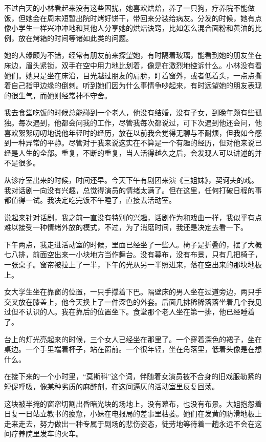 不过白天的小林看起来没有这些困扰，她喜欢烘焙，养了一只狗，疗养院不能做饭，但她会在周末短暂出院时烤好饼干，带回来分装给病友。分发的时候，她有点像小学生一样兴冲冲地和其他人分享她的烘焙诀窍，比如怎么混合面粉和黄油的比例，放在烤箱的时间等诸如此类的问题。

她的人缘颇为不错，经常有朋友前来探望她，有时隔着玻璃，能看到她的朋友坐在床边，眉头紧锁，双手在空中用力地比划着，像是在激烈地控诉什么。小林没有看她们。她只是坐在床沿，目光越过朋友的肩膀，盯着窗外，或者低着头，一点点撕着自己指甲边缘的倒刺。听到她们因为什么事情争吵起来，有时远望她的朋友表现的很生气，而她则经常神不守舍。

我去食堂吃饭的时候总能碰到一个老人，他没有结婚，没有子女，到晚年颇有些孤独。每次遇到，他都会问我的工作，尽管我每次都说过，可下次遇到他还会问，他喜欢絮絮叨叨地说他年轻时的经历，放在以前我会觉得无聊与不耐烦，但我如今感到一种异常的平静。尽管对于我来说这实在不算是一个有趣的经历，但对他来说已经是人生的全部。重复，不断的重复，当人活得越久之后，会发现人可以讲述的并不是很多。

从诊疗室出来的时候，时间还早。今天下午有剧团来演《三姐妹》，契诃夫的戏。我对话剧一向没有兴趣，总觉得演员的情绪太满了。但在这里，任何打破日程的事都值得一试。我决定吃完饭不午睡了，直接去活动室。

说起来针对话剧，我之前一直没有特别的兴趣，话剧作为和戏曲一样，我似乎有点难以接受一种情绪外放的模式，不过，为了消磨时间，我还是决定去看一下。

下午两点，我走进活动室的时候，里面已经坐了一些人。椅子是折叠的，摆了大概七八排，前面空出来一小块地方当作舞台。没有幕布，没有布景，只有几把椅子，一张桌子。窗帘被拉上了一半，下午的光从另一半照进来，落在空出来的那块地板上。

女大学生坐在靠窗的位置，一只手撑着下巴。隔壁床的男人坐在过道旁边，两只手交叉放在膝盖上，他今天换上了一件深色的外套。后面几排稀稀落落坐着几个我见过但不认识的人。我在靠后的位置坐下。食堂那个老人坐在第一排，他已经睡着了。

台上的灯光亮起来的时候，三个女人已经坐在那里了。一个穿着深色的裙子，坐在桌边。一个手里端着杯子，站在窗前。一个很年轻，坐在角落里，低着头像是在想什么。

在接下来的一个小时里，“莫斯科”这个词，伴随着女演员被不合身的旧戏服勒紧的短促呼吸，像某种劣质的麻醉剂，在这间逼仄的活动室里反复回荡。

这块被半掩的窗帘切割出昏暗光块的场地上，没有幕布，也没有布景。大姐抱怨着日复一日站立教书的疲惫，小妹在电报局的差事里枯萎。她们在发黄的防滑地板上走来走去，努力做出一种专属于剧场的悲伤姿态，徒劳地等待着一趟永远不会在这间疗养院里发车的火车。

